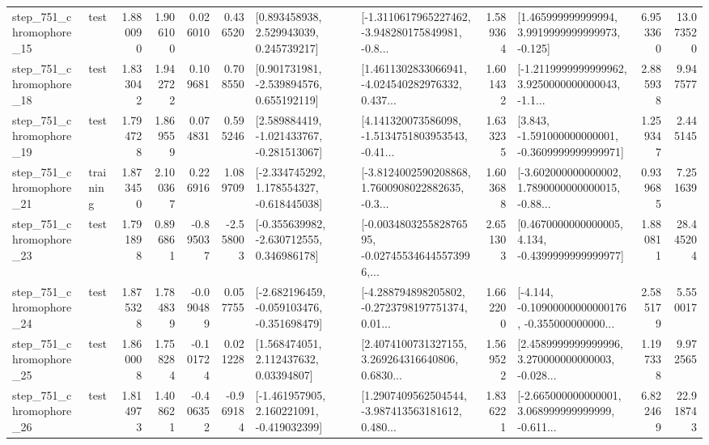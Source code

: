 \begin{tabular}{llrrrrllrlrr}
  step\_751\_chromophore\_15 &      test &      1.880090 &    1.906100 &      0.026010 &  0.436520 &     [0.893458938, 2.529943039, 0.245739217] &  [-1.3110617965227462, -3.948280175849981, -0.8... &       1.589364 &    [1.465999999999994, 3.9919999999999973, -0.125] &            6.953360 &         13.073520 \\
  step\_751\_chromophore\_18 &      test &      1.833042 &    1.942722 &      0.109681 &  0.708550 &    [0.901731981, -2.539894576, 0.655192119] &  [1.4611302833066941, -4.024540282976332, 0.437... &       1.601432 &  [-1.2119999999999962, 3.9250000000000043, -1.1... &            2.885938 &          9.947577 \\
  step\_751\_chromophore\_19 &      test &      1.794728 &    1.869559 &      0.074831 &  0.595246 &   [2.589884419, -1.021433767, -0.281513067] &  [4.141320073586098, -1.5134751803953543, -0.41... &       1.633235 &   [3.843, -1.591000000000001, -0.3609999999999971] &            1.259347 &          2.445145 \\
  step\_751\_chromophore\_21 &  training &      1.873450 &    2.100367 &      0.226916 &  1.089709 &   [-2.334745292, 1.178554327, -0.618445038] &  [-3.8124002590208868, 1.7600908022882635, -0.3... &       1.603688 &  [-3.602000000000002, 1.7890000000000015, -0.88... &            0.939685 &          7.251639 \\
  step\_751\_chromophore\_23 &      test &      1.791898 &    0.896861 &     -0.895037 & -2.558003 &   [-0.355639982, -2.630712555, 0.346986178] &  [-0.003480325582876595, -0.027455346445573996,... &       2.651303 &   [0.4670000000000005, 4.134, -0.4399999999999977] &            1.880811 &         28.445204 \\
  step\_751\_chromophore\_24 &      test &      1.875328 &    1.784839 &     -0.090489 &  0.057755 &  [-2.682196459, -0.059103476, -0.351698479] &  [-4.288794898205802, -0.2723798197751374, 0.01... &       1.662200 &  [-4.144, -0.10900000000000176, -0.355000000000... &            2.585179 &          5.550017 \\
  step\_751\_chromophore\_25 &      test &      1.860008 &    1.758284 &     -0.101724 &  0.021228 &      [1.568474051, 2.112437632, 0.03394807] &  [2.4074100731327155, 3.269264316640806, 0.6830... &       1.569522 &  [2.4589999999999996, 3.270000000000003, -0.028... &            1.197338 &          9.972565 \\
  step\_751\_chromophore\_26 &      test &      1.814973 &    1.408621 &     -0.406352 & -0.969184 &   [-1.461957905, 2.160221091, -0.419032399] &  [1.2907409562504544, -3.987413563181612, 0.480... &       1.836221 &  [-2.665000000000001, 3.068999999999999, -0.611... &            6.822469 &         22.918743 \\

\end{tabular}
